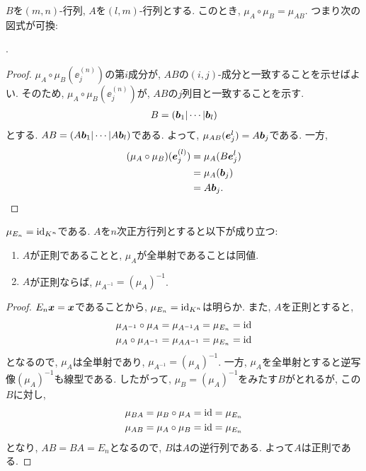 \begin{prop}
  $B$を$(m,n)$-行列,
  $A$を$(l,m)$-行列とする.
  このとき,
  $\mu_A\circ \mu_B=\mu_{AB}$.
  つまり次の図式が可換:
  \begin{center}
  .
  \end{center}
\end{prop}
\begin{proof}
  $\mu_A\circ\mu_B(\ee_j^(n))$の第$i$成分が, $AB$の$(i,j)$-成分と一致することを示せばよい.
  そのため,
  $\mu_A\circ\mu_B(\ee_j^(n))$が, $AB$の$j$列目と一致することを示す.
  \begin{align*}
    B=(\boldsymbol{b}_1|\cdots|\boldsymbol{b}_l)
  \end{align*}
  とする.
  $AB=(A\boldsymbol{b}_1|\cdots|A\boldsymbol{b}_l)$である.
  よって, $\mu_{AB}(\boldsymbol{e}_j^{l})=A\boldsymbol{b}_j$である.
  一方,
  \begin{align*}
    (\mu_A\circ \mu_B)(\boldsymbol{e}_j^{(l)})
    &=\mu_A(B\boldsymbol{e}_j^{l})\\
    &=\mu_A(\boldsymbol{b}_j)\\
    &=A\boldsymbol{b}_j.
  \end{align*} 
\end{proof}
\begin{prop}
  $\mu_{E_n}=\operatorname{id}_{K^n}$である.
  $A$を$n$次正方行列とすると以下が成り立つ:
  \begin{enumerate}
  \item $A$が正則であることと, $\mu_A$が全単射であることは同値.
  \item $A$が正則ならば, $\mu_{A^{-1}}=(\mu_A)^{-1}$.
  \end{enumerate}
\end{prop}
\begin{proof}
  $E_n\boldsymbol{x}=\boldsymbol{x}$であることから,
  $\mu_{E_n}=\operatorname{id}_{K^n}$は明らか.
  また, $A$を正則とすると,
  \begin{align*}
    \mu_{A^{-1}}\circ \mu_{A} &= \mu_{A^{-1}A}=\mu_{E_n}=\operatorname{id}\\
    \mu_{A}\circ \mu_{A^{-1}} &= \mu_{AA^{-1}}=\mu_{E_n}=\operatorname{id}
  \end{align*}
  となるので, $\mu_A$は全単射であり,
  $\mu_{A^{-1}}=(\mu_A)^{-1}$.
  一方, $\mu_A$を全単射とすると逆写像$(\mu_A)^{-1}$も線型である.
  したがって, $\mu_B=(\mu_A)^{-1}$をみたす$B$がとれるが,
  この$B$に対し,
   \begin{align*}
     \mu_{BA}&=\mu_{B}\circ \mu_{A}= \operatorname{id}=\mu_{E_n}\\
     \mu_{AB}&=\mu_{A}\circ \mu_{B}=\operatorname{id} =\mu_{E_n}
   \end{align*}
   となり, $AB=BA=E_n$となるので, $B$は$A$の逆行列である.
   よって$A$は正則である.
\end{proof}
